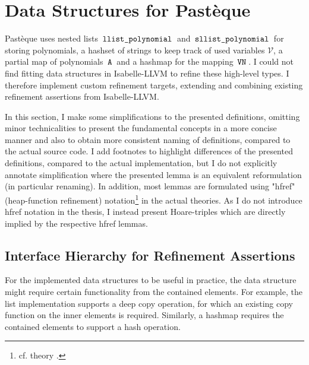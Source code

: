 \section{Data Structures for Pastèque}\label{sec:low-level-datatypes-in-isabelle-llvm}

Pastèque uses nested lists $\,\text{\ttfamily llist\_polynomial}\,$ and $\,\text{\ttfamily sllist\_polynomial}\,$ for storing polynomials, a hashset of strings to keep track of used variables $\mathscr{V}$, a partial map of polynomials $\,\text{\ttfamily A}\,$ and a hashmap for the mapping $\,\text{\ttfamily VN}\,$.
I could not find fitting data structures in Isabelle-LLVM to refine these high-level types.
I therefore implement custom refinement targets, extending and combining existing refinement assertions from Isabelle-LLVM.

In this section, I make some simplifications to the presented definitions, omitting minor technicalities to present the fundamental concepts in a more concise manner and also to obtain more consistent naming of definitions, compared to the actual source code.
I add footnotes to highlight differences of the presented definitions, compared to the actual implementation, but I do not explicitly annotate simplification where the presented lemma is an equivalent reformulation (in particular renaming).
In addition, most lemmas are formulated using "hfref" (heap-function refinement) notation\footnote{cf. theory .} in the actual theories.
As I do not introduce hfref notation in the thesis, I instead present Hoare-triples which are directly implied by the respective hfref lemmas.

\subsection{Interface Hierarchy for Refinement Assertions}\label{sec:interface-hierarchy-for-refinement-assertions}

For the implemented data structures to be useful in practice, the data structure might require certain functionality from the contained elements.
For example, the list implementation supports a deep copy operation, for which an existing copy function on the inner elements is required.
Similarly, a hashmap requires the contained elements to support a hash operation.

